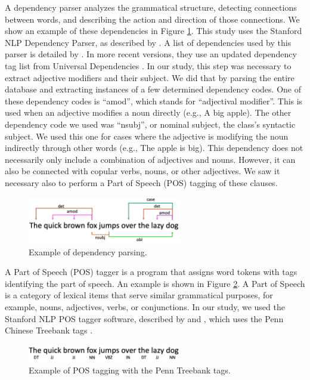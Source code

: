 \documentclass[smallextended,natbib]{svjour3}       %
\begin{document}
    A dependency parser analyzes the grammatical structure, detecting connections between words, and describing the action and direction of those connections. We show an example of these dependencies in Figure \ref{fig:depparse}. This study uses the Stanford NLP Dependency Parser, as described by \cite{chen-EMNLP:2014}. A list of dependencies used by this parser is detailed by \cite{marneffe_manning_2016_depparse_manual}. In more recent versions, they use an updated dependency tag list from Universal Dependencies \cite[][]{zeman2018conll}. In our study, this step was necessary to extract adjective modifiers and their subject. We did that by parsing the entire database and extracting instances of a few determined dependency codes. One of these dependency codes is ``amod'', which stands for ``adjectival modifier''. This is used when an adjective modifies a noun directly (e.g., A big apple). The other dependency code we used was ``nsubj'', or nominal subject, the class's syntactic subject. We used this one for cases where the adjective is modifying the noun indirectly through other words (e.g., The apple is big). This dependency does not necessarily only include a combination of adjectives and nouns. However, it can also be connected with copular verbs, nouns, or other adjectives. We saw it necessary also to perform a Part of Speech (POS) tagging of these clauses.

    \begin{figure}[ht]
    \centering
    \includegraphics[width=0.6\textwidth]{depparse.png}
    \caption{Example of dependency parsing.}
    \label{fig:depparse}
    \end{figure}

    A Part of Speech (POS) tagger is a program that assigns word tokens with tags identifying the part of speech. An example is shown in Figure \ref{fig:postag}. A Part of Speech is a category of lexical items that serve similar grammatical purposes, for example, nouns, adjectives, verbs, or conjunctions. In our study, we used the Stanford NLP POS tagger software, described by \cite{toutanova2000enriching} and \cite{toutanova2003feature}, which uses the Penn Chinese Treebank tags \cite[][]{xia_penntreebank}.

    \begin{figure}[ht]
    \centering
    \includegraphics[width=0.6\textwidth]{postag.png}
    \caption{Example of POS tagging with the Penn Treebank tags.}
    \label{fig:postag}
    \end{figure}
\end{document}
